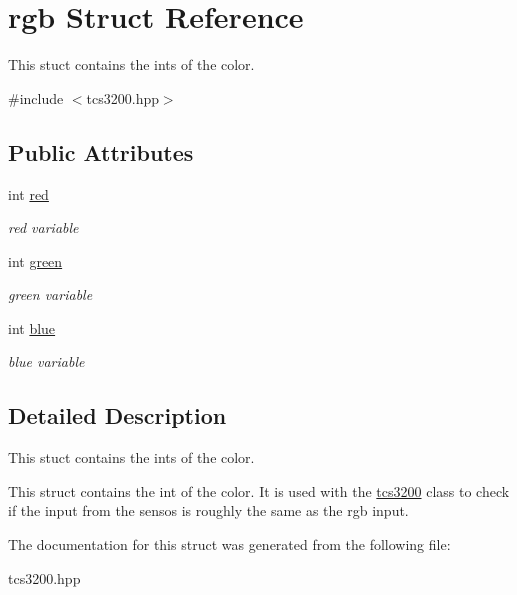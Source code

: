 \hypertarget{structrgb}{}\section{rgb Struct Reference}
\label{structrgb}


This stuct contains the ints of the color.  




{\ttfamily \#include $<$tcs3200.\+hpp$>$}

\subsection*{Public Attributes}
\begin{DoxyCompactItemize}
\item 
\mbox{\label{structrgb_a8f32ff56279fc5f722fbfbd4d04d5ae4}} 
int \hyperlink{structrgb_a8f32ff56279fc5f722fbfbd4d04d5ae4}{red}
\begin{DoxyCompactList}\small\item\em red variable \end{DoxyCompactList}\item 
\mbox{\label{structrgb_abd054b60f32b30c4e9e013686057dfbf}} 
int \hyperlink{structrgb_abd054b60f32b30c4e9e013686057dfbf}{green}
\begin{DoxyCompactList}\small\item\em green variable \end{DoxyCompactList}\item 
\mbox{\label{structrgb_ad1f14d7b6d1a6d065129b16c94481433}} 
int \hyperlink{structrgb_ad1f14d7b6d1a6d065129b16c94481433}{blue}
\begin{DoxyCompactList}\small\item\em blue variable \end{DoxyCompactList}\end{DoxyCompactItemize}


\subsection{Detailed Description}
This stuct contains the ints of the color. 

This struct contains the int of the color. It is used with the \hyperlink{classtcs3200}{tcs3200} class to check if the input from the sensos is roughly the same as the rgb input. 

The documentation for this struct was generated from the following file\+:\begin{DoxyCompactItemize}
\item 
tcs3200.\+hpp\end{DoxyCompactItemize}
